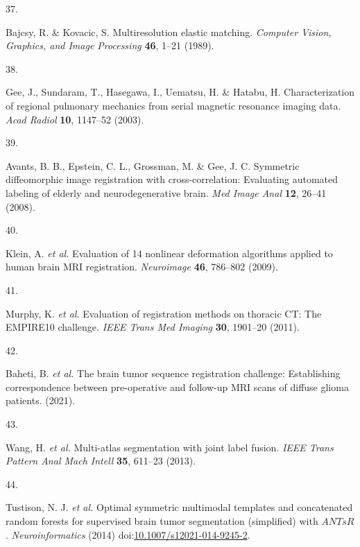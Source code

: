 \documentclass[
  12pt,
]{article}
\newlength{\cslhangindent}
\newlength{\csllabelwidth}
\newenvironment{CSLReferences}[2] %
 {%
  \setlength{\parindent}{0pt}
  \ifodd #1 \everypar{\setlength{\hangindent}{\cslhangindent}}\ignorespaces\fi
  \ifnum #2 > 0
  \setlength{\parskip}{#2\baselineskip}
  \fi
 }%
 {}
\newcommand{\CSLLeftMargin}[1]{\parbox[t]{\csllabelwidth}{#1}}
\newcommand{\CSLRightInline}[1]{\parbox[t]{\linewidth - \csllabelwidth}{#1}\break}
\begin{document}
\begin{CSLReferences}{0}{0}
\leavevmode{}%
\CSLLeftMargin{37. }
\CSLRightInline{Bajcsy, R. \& Kovacic, S. Multiresolution elastic
matching. \emph{Computer Vision, Graphics, and Image Processing}
\textbf{46}, 1--21 (1989).}

\leavevmode{}%
\CSLLeftMargin{38. }
\CSLRightInline{Gee, J., Sundaram, T., Hasegawa, I., Uematsu, H. \&
Hatabu, H. Characterization of regional pulmonary mechanics from serial
magnetic resonance imaging data. \emph{Acad Radiol} \textbf{10},
1147--52 (2003).}

\leavevmode{}%
\CSLLeftMargin{39. }
\CSLRightInline{Avants, B. B., Epstein, C. L., Grossman, M. \& Gee, J.
C. Symmetric diffeomorphic image registration with cross-correlation:
Evaluating automated labeling of elderly and neurodegenerative brain.
\emph{Med Image Anal} \textbf{12}, 26--41 (2008).}

\leavevmode{}%
\CSLLeftMargin{40. }
\CSLRightInline{Klein, A. \emph{et al.} Evaluation of 14 nonlinear
deformation algorithms applied to human brain {MRI} registration.
\emph{Neuroimage} \textbf{46}, 786--802 (2009).}

\leavevmode{}%
\CSLLeftMargin{41. }
\CSLRightInline{Murphy, K. \emph{et al.} Evaluation of registration
methods on thoracic {CT}: The {EMPIRE10} challenge. \emph{IEEE Trans Med
Imaging} \textbf{30}, 1901--20 (2011).}

\leavevmode{}%
\CSLLeftMargin{42. }
\CSLRightInline{Baheti, B. \emph{et al.} The brain tumor sequence
registration challenge: Establishing correspondence between
pre-operative and follow-up MRI scans of diffuse glioma patients.
(2021).}

\leavevmode{}%
\CSLLeftMargin{43. }
\CSLRightInline{Wang, H. \emph{et al.} Multi-atlas segmentation with
joint label fusion. \emph{IEEE Trans Pattern Anal Mach Intell}
\textbf{35}, 611--23 (2013).}

\leavevmode{}%
\CSLLeftMargin{44. }
\CSLRightInline{Tustison, N. J. \emph{et al.} Optimal symmetric
multimodal templates and concatenated random forests for supervised
brain tumor segmentation (simplified) with {\(ANTsR\)}.
\emph{Neuroinformatics} (2014)
doi:\href{https://doi.org/10.1007/s12021-014-9245-2}{10.1007/s12021-014-9245-2}.}


\end{CSLReferences}
\end{document}
